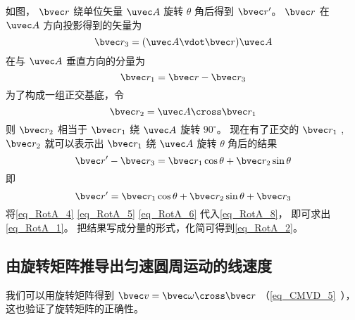 如图， $\bvec r$ 绕单位矢量 $\uvec A$ 旋转 $\theta$ 角后得到 $\bvec r'$。  $\bvec r$ 在 $\uvec A$ 方向投影得到的矢量为
\begin{equation}\label{eq_RotA_4}
\bvec r_3 = (\uvec A \vdot \bvec r)\uvec A
\end{equation}
在与 $\uvec A$ 垂直方向的分量为
\begin{equation}\label{eq_RotA_5}
\bvec r_1 = \bvec r - \bvec r_3
\end{equation}
为了构成一组正交基底，令
\begin{equation}\label{eq_RotA_6}
\bvec r_2 = \uvec A \cross \bvec r_1
\end{equation}
则 $\bvec r_2$ 相当于 $\bvec r_1$ 绕 $\uvec A$ 旋转 $90^\circ$。 现在有了正交的 $\bvec r_1$ , $\bvec r_2$  就可以表示出 $\bvec r_1$ 绕 $\uvec A$ 旋转 $\theta$ 角后的结果
\begin{equation}
\bvec r' - \bvec r_3 = \bvec r_1\cos \theta  + \bvec r_2\sin \theta
\end{equation}
即
\begin{equation}\label{eq_RotA_8}
\bvec r' = \bvec r_1\cos \theta  + \bvec r_2\sin \theta  + \bvec r_3
\end{equation} 
将\autoref{eq_RotA_4} \autoref{eq_RotA_5} \autoref{eq_RotA_6} 代入\autoref{eq_RotA_8}， 即可求出\autoref{eq_RotA_1}。 把结果写成分量的形式，化简可得到\autoref{eq_RotA_2}。

\subsection{由旋转矩阵推导出匀速圆周运动的线速度} 

我们可以用旋转矩阵得到 $\bvec v = \bvec \omega  \cross \bvec r$ （\autoref{eq_CMVD_5}~）， 这也验证了旋转矩阵的正确性。

